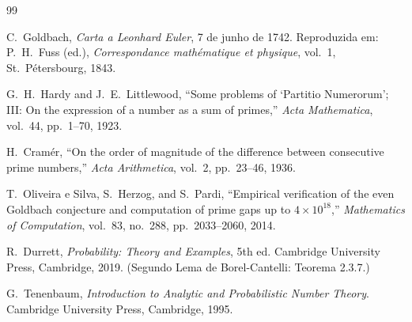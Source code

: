 \documentclass{article}
\begin{document}
	\begin{thebibliography}{99}
		
		C.~Goldbach, \emph{Carta a Leonhard Euler}, 7 de junho de 1742.
		Reproduzida em: P.~H.~Fuss (ed.), \textit{Correspondance
			mathématique et physique}, vol.~1, St.\ Pétersbourg, 1843.
		
		G.~H.~Hardy and J.~E.~Littlewood,
		``Some problems of `Partitio Numerorum'; III: On the expression
		of a number as a sum of primes,''
		\textit{Acta Mathematica}, vol.~44, pp.~1--70, 1923.
		
		H.~Cramér,
		``On the order of magnitude of the difference between consecutive
		prime numbers,''
		\textit{Acta Arithmetica}, vol.~2, pp.~23--46, 1936.
		
		T.~Oliveira e Silva, S.~Herzog, and S.~Pardi,
		``Empirical verification of the even Goldbach conjecture and
		computation of prime gaps up to $4 \times 10^{18}$,''
		\textit{Mathematics of Computation}, vol.~83, no.~288,
		pp.~2033--2060, 2014.
		
		R.~Durrett,
		\textit{Probability: Theory and Examples}, 5th ed.
		Cambridge University Press, Cambridge, 2019.
		(Segundo Lema de Borel-Cantelli: Teorema 2.3.7.)
		
		G.~Tenenbaum,
		\textit{Introduction to Analytic and Probabilistic Number Theory}.
		Cambridge University Press, Cambridge, 1995.
		
	\end{thebibliography}
	
\end{document}
